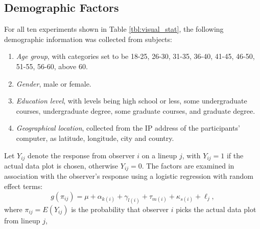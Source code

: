 \documentclass[10pt]{article}\usepackage[]{graphicx}\usepackage[]{color}
\newcommand{\dc}[1]{{\color{green} #1}}
\begin{document}

\subsection{Demographic Factors}  %
\noindent
For all  ten experiments shown in Table \ref{tbl:visual_stat}, the following demographic information was collected from subjects:

\begin{enumerate} \leftmargin 5cm  \itemsep 0in
\item {\it Age group}, with categories set to be 18-25, 26-30, 31-35, 36-40, 41-45, 46-50, 51-55, 56-60, above 60.
\item {\it Gender}, male or female.
\item {\it Education level}, with levels being high school or less, some undergraduate courses, undergraduate degree, some graduate courses, and graduate degree.
\item {\it Geographical location}, collected from the IP address of the participants' computer, as latitude, longitude, city and country. 
\end{enumerate}
%
%
Let $Y_{ij}$ denote the response from observer $i$ on a lineup $j$, with $Y_{ij} =1$ if the actual data plot is chosen, otherwise $Y_{ij} =0$. The factors are examined in association with the observer's response using a logistic regression with random effect terms:
\begin{equation} \label{eqn:demographic_response}
g( \pi_{ij} )= \mu + \alpha_{k(i)} + \gamma_{l(i)} + \tau_{m(i)}+ \kappa_{s(i)} + \ell_j,  
\end{equation}
where $\pi_{ij}=  E(Y_{ij})$ is the probability that  observer $i$ picks the actual data plot from lineup $j$, %
\end{document}
